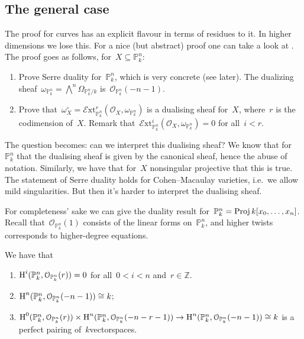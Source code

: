 \documentclass[10pt,a4paper]{article}
\begin{document}
\subsection{The general case}
\label{subsection:remarks}
The proof for curves has an explicit flavour in terms of residues to it. In higher dimensions we lose this. For a nice (but abstract) proof one can take a look at \cite[\S III.7]{hartshorne-algebraic-geometry}. The proof goes as follows, for~$X\subseteq\mathbb{P}_k^n$:
\begin{enumerate}
  \item Prove Serre duality for~$\mathbb{P}_k^n$, which is very concrete (see later). The dualizing sheaf~$\omega_{\mathbb{P}_k^n}=\bigwedge^n\Omega_{\mathbb{P}_k^n/k}$ is~$\mathcal{O}_{\mathbb{P}_k^n}(-n-1)$.
  \item Prove that~$\omega_X^\circ=\mathcal{E}\mathrm{xt}^r_{\mathbb{P}_k^n}(\mathcal{O}_X,\omega_{\mathbb{P}_k^n})$ is a dualising sheaf for~$X$, where~$r$ is the codimension of~$X$. Remark that~$\mathcal{E}\mathrm{xt}_{\mathbb{P}_k^n}^i(\mathcal{O}_X,\omega_{\mathbb{P}_k^n})=0$ for all~$i<r$.
\end{enumerate}
The question becomes: can we interpret this dualising sheaf? We know that for~$\mathbb{P}_k^n$ that the dualising sheaf is given by the canonical sheaf, hence the abuse of notation. Similarly, we have that for~$X$ nonsingular projective that this is true. The statement of Serre duality holds for Cohen--Macaulay varieties, i.e.\ we allow mild singularities. But then it's harder to interpret the dualising sheaf.

For completeness' sake we can give the duality result for~$\mathbb{P}_k^n=\operatorname{Proj} k[x_0,\dotsc,x_n]$. Recall that~$\mathcal{O}_{\mathbb{P}_k^n}(1)$ consists of the linear forms on~$\mathbb{P}_k^n$, and higher twists corresponds to higher-degree equations.
\begin{theorem}
  \label{theorem:serre-duality-projective-space}
  We have that
  \begin{enumerate}
    \item $\operatorname{H}^i(\mathbb{P}_k^n,\mathcal{O}_{\mathbb{P}_k^n}(r))=0$ for all~$0<i<n$ and~$r\in\mathbb{Z}$.
    \item $\operatorname{H}^n(\mathbb{P}_k^n,\mathcal{O}_{\mathbb{P}_k^n}(-n-1))\cong k$;
    \item $\operatorname{H}^0(\mathbb{P}_k^n,\mathcal{O}_{\mathbb{P}_k^n}(r))\times\operatorname{H}^n(\mathbb{P}_k^n,\mathcal{O}_{\mathbb{P}_k^n}(-n-r-1))\to\operatorname{H}^n(\mathbb{P}_k^n,\mathcal{O}_{\mathbb{P}_k^n}(-n-1))\cong k$ is a perfect pairing of~$k$\dash vectorspaces.
  \end{enumerate}
\end{theorem}
\end{document}
